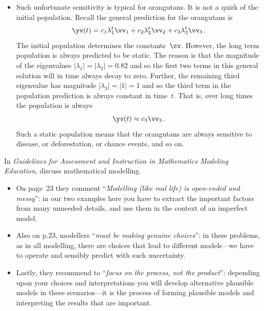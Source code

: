 \begin{example}
\begin{solution}
\begin{itemize}
\item Such unfortunate sensitivity is typical for orangutans.  
It is not a quirk of the initial population.
Recall the general prediction for the orangutans is 
\begin{equation*}
\yv(t)=c_1\lambda_1^t\vv_1+c_2\lambda_2^t\vv_2+c_3\lambda_3^t\vv_3\,.
\end{equation*}
The initial population determines the constants~\(\cv\).
However, the long term population is always predicted to be static.
The reason is that the magnitude of the eigenvalues \(|\lambda_1|=|\lambda_2|=0.82\) and so the first two terms in this general solution will in time always decay to zero.
Further, the remaining third eigenvalue has magnitude \(|\lambda_3|=|1|=1\) and so the third term in the population prediction is always constant in time~\(t\).
That is, over long times the population is always
\begin{equation*}
\yv(t)\approx c_3\vv_3\,.
\end{equation*}
Such a static population means that the orangutans are always sensitive to  disease, or deforestation, or chance events, and so on.

\end{itemize}
\end{solution}
\end{example}




In \emph{Guidelines for Assessment and Instruction in Mathematics Modeling Education}, \cite{gaimme2016} discuss mathematical modelling.
\begin{itemize}
\item On page~23 they comment ``\emph{Modelling (like real life) is open-ended and messy}'': in our two examples here you have to extract the important factors from many unneeded details, and use them in the context of an imperfect model.
\item Also on p.23, modellers ``\emph{must be making genuine choices}'': in these problems, as in all modelling, there are choices that lead to different models---we have to operate and sensibly predict with such uncertainty.
\item Lastly, they recommend to ``\emph{focus on the process, not the product}'': depending upon your choices and interpretations you will develop alternative plausible models in these scenarios---it is the process of forming plausible models and interpreting the results that are important.
\end{itemize}



